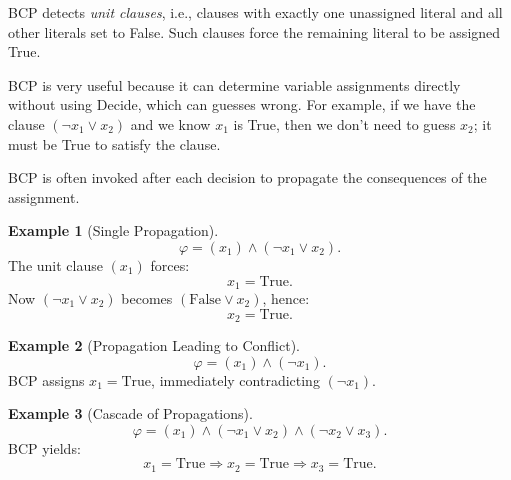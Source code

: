 \documentclass[oneside,11pt,dvipsnames]{book}
\numberwithin{equation}{section}
\theoremstyle{definition}
\newtheorem{example}{Example}[section]
\theoremstyle{remark}
\begin{document}
BCP detects \emph{unit clauses}, i.e., clauses with exactly one unassigned literal
and all other literals set to False. Such clauses force the remaining literal to be
assigned True.

BCP is very useful because it can determine variable assignments directly without using Decide, which can guesses wrong. For example, if we have the clause $(\lnot x_1 \lor x_2)$ and we know $x_1$ is True, then we don't need to guess $x_2$; it must be True to satisfy the clause.

BCP is often invoked after each decision to propagate the consequences of the assignment.

\begin{example}[Single Propagation]
\[
\varphi = (x_1) \land (\lnot x_1 \lor x_2).
\]
The unit clause $(x_1)$ forces:
\[
x_1 = \text{True}.
\]
Now $(\lnot x_1 \lor x_2)$ becomes $(\text{False} \lor x_2)$, hence:
\[
x_2 = \text{True}.
\]
\end{example}

\begin{example}[Propagation Leading to Conflict]
\[
\varphi = (x_1) \land (\lnot x_1).
\]
BCP assigns $x_1 = \text{True}$, immediately contradicting $(\lnot x_1)$.
\end{example}

\begin{example}[Cascade of Propagations]
\[
\varphi = (x_1) \land (\lnot x_1 \lor x_2) \land (\lnot x_2 \lor x_3).
\]
BCP yields:
\[
x_1=\mathrm{True} \Rightarrow x_2=\mathrm{True} \Rightarrow x_3=\mathrm{True}.
\]
\end{example}



\end{document}

